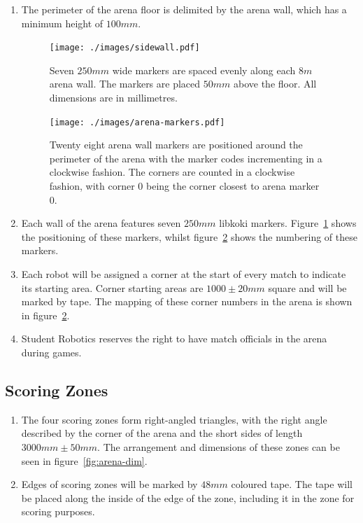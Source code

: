 \begin{enumerate}
\item The perimeter of the arena floor is delimited by the arena wall, which has a minimum height of $100mm$.

\begin{figure}
  \centering
  \texttt{[image: ./images/sidewall.pdf]}
  \caption{Seven $250mm$ wide markers are spaced evenly along each $8m$ arena wall.
           The markers are placed $50mm$ above the floor.
           All dimensions are in millimetres.}
  \label{fig:arena-wall}
\end{figure}

\begin{figure}
  \centering
  \texttt{[image: ./images/arena-markers.pdf]}
  \caption{Twenty eight arena wall markers are positioned around the perimeter of the arena with the marker codes incrementing in a clockwise fashion.
           The corners are counted in a clockwise fashion, with corner 0 being the corner closest to arena marker 0.}
  \label{fig:arena-zones}
\end{figure}

\item Each wall of the arena features seven $250mm$ libkoki markers.
      Figure~\ref{fig:arena-wall} shows the positioning of these markers, whilst figure~\ref{fig:arena-zones} shows the numbering of these markers.

\item Each robot will be assigned a corner at the start of every match to indicate its starting area.
      Corner starting areas are $1000 \pm 20mm$ square and will be marked by tape.
      The mapping of these corner numbers in the arena is shown in figure~\ref{fig:arena-zones}.

\item Student Robotics reserves the right to have match officials in the arena during games.

\end{enumerate}


\subsection{Scoring Zones}
\label{sub:Zones}

\begin{enumerate}
\item The four scoring zones form right-angled triangles, with the right angle described by the corner of the arena and the short sides of length $3000mm \pm 50mm$.
      The arrangement and dimensions of these zones can be seen in figure~\ref{fig:arena-dim}.

\item Edges of scoring zones will be marked by $48mm$ coloured tape.
      The tape will be placed along the inside of the edge of the zone, including it in the zone for scoring purposes.
\end{enumerate}

